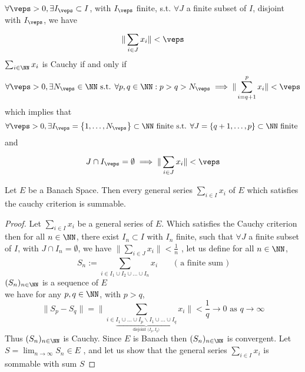 	$\forall \veps  > 0,\exists I_{\veps } \subset I$, with 
	$I_{\veps } $ finite, s.t. $\forall J $ a finite subset of $I $, disjoint with $I_{\veps } $,
	we have 
	\[
	\| \sum_{i \in J}^{} x_{i} \|  <  \veps 
	\]
	\divider 
	$\sum_{i \in \NN}^{} x_{i} $  is Cauchy if and only if 
	\[
	\forall  \veps  >  0, \exists  N_{\veps } \in \NN \text{ s.t. }  
	\forall  p,q \in  \NN: p > q > N_{\veps } \implies 
	\| \sum_{i=q+1}^{p} x_{i}  \|  <  \veps 
	\]
	which implies that 
	\[
	\forall  \veps  > 0, 
	\exists  I_{\veps } = 
	\left\{ 1, \hdots , N_{\veps } \right\} \subset \NN \text{ finite s.t. } 
	\forall  J = \left\{ q+1, \hdots, p \right\} 
	\subset \NN \text{ finite } 
	\]
	and 
	\[
	J \cap I_{\veps } = \emptyset  \implies 
	\| \sum_{i \in J}^{} x_{i} \|  <  \veps 
	\]
	\begin{theorem}[]
	Let $E $ be a Banach Space. 
	Then every general series $\sum_{i \in I}^{} x_{i} $  
	of $E $ which satisfies the cauchy criterion is summable. 
	\end{theorem}
	\begin{proof}
	Let $\sum_{i \in I}^{} x_{i} $ be a general series of $E $. Which satisfies the Cauchy
	criterion then for all $n \in \NN $, there exist $I_{n} \subset I $  with $I_{n} $ finite, 
	such that $\forall  J $ a finite subset of $I $, with $J \cap I_{n} = \emptyset  $, we have 
	$\| \sum_{i \in J}^{} x_{i}  \| <  \frac{1}{n}  $ , let us define for all $n \in \NN $, 
	\[
	S_{n} := 
	\sum_{i \in  I_1 \cup  I_2 \cup  \hdots \cup I_{n} }^{}  x_{i} \quad \quad 
	\text{( a finite sum )} 
	\]
	$(S_{n}) _{n \in \NN} $  is a sequence of $E $\\ 
	we have for any $p,q \in \NN $, with $p > q $, 
	\[
		\| S_{p} - S_{q}  \|  = 
		\| \sum_{i \in
			\underbrace{
			I_{1} \cup \hdots \cup I_{p} \backslash 
		I_{1} \cup \hdots \cup I_{q}
			}_{\text{ disjoint ($I_{p},I_{q}$) } } 
	}^{} x_{i} \|   < \frac{1}{q} \rightarrow 0 \text{ as }  q \rightarrow \infty 
	\]
	Thus $(S_{n}) _{n \in \NN} $ is Cauchy. Since $E $ is Banach then $(S_{n}) _{n \in \NN} $  
	is convergent. Let $S = \lim_{n \to \infty} S_{n} \in E$ , and let us show that 
	the general series $\sum_{i \in I}^{} x_{i} $  is sommable with sum $S$ 
	\end{proof}
% 
